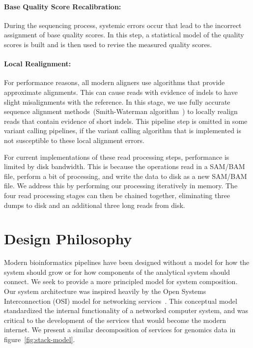 \documentclass[10pt,twocolumn]{article}
\begin{document}
\paragraph{Base Quality Score Recalibration:} 
\label{sec:bqsr}

During the sequencing process, systemic errors occur that lead to the incorrect assignment of base quality scores. In this step, a
statistical model of the quality scores is built and is then used to revise the measured quality scores.

\paragraph{Local Realignment:} 
\label{sec:local-realignment}

For performance reasons, all modern aligners use algorithms that provide approximate alignments. This can cause reads with
evidence of indels to have slight misalignments with the reference. In this stage, we use fully accurate sequence alignment
methods~(Smith-Waterman algorithm~\cite{smith81}) to locally realign reads that contain evidence of short indels. This pipeline
step is omitted in some variant calling pipelines, if the variant calling algorithm that is implemented is not susceptible to these
local alignment errors.

For current implementations of these read processing steps, performance is limited by disk bandwidth. This is because the operations
read in a SAM/BAM file, perform a bit of processing, and write the data to disk as a new SAM/BAM file. We address this by performing
our processing iteratively in memory. The four read processing stages can then be chained together, eliminating three dumps to
disk and an additional three long reads from disk. 

\section{Design Philosophy}
\label{sec:design-philosophy}

Modern bioinformatics pipelines have been designed without a model for how the system should grow or for how
components of the analytical system should connect. We seek to provide a more principled model for system composition.
Our system architecture was inspired heavily by the Open Systems Interconnection (OSI) model for networking
services~\cite{zimmermann80}. This conceptual model standardized the internal functionality of a networked
computer system, and was critical to the development of the services that would become the modern internet. We present
a similar decomposition of services for genomics data in figure~\ref{fig:stack-model}.
\end{document}
